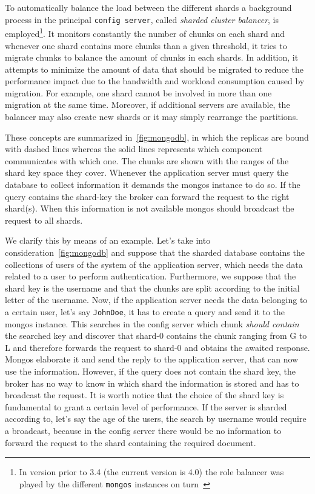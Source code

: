 To automatically balance the load between the different shards a background
process in the principal \texttt{config server}, called \emph{sharded cluster
balancer},
is employed\footnote{In version prior to 3.4 (the current version is 4.0) the
role balancer was played by the different \texttt{mongos}
instances on turn~\cite{bib:mongodb-docs}}. It monitors constantly the number
of chunks on each shard and  whenever one  shard contains more chunks than a
given threshold, it tries to migrate chunks to balance the amount of chunks
in each shards. In addition, it attempts to minimize the amount of data
that should be migrated to reduce the performance impact due to the bandwidth
and workload consumption caused by migration. For example, one shard cannot be
involved in more than one migration at the same time. Moreover, if additional
servers are available, the balancer may also create new shards or it may simply
rearrange the partitions.

These concepts are summarized in~\autoref{fig:mongodb}, in which the replicas
are bound with dashed lines whereas the solid lines represents which
component communicates with which one. The chunks are shown with the
ranges of the shard key space they cover.
Whenever the application server must query the database to collect information
it demands the mongos instance to do so. If the query contains the shard-key
the broker can forward the request to the right shard(s). When this information
is not available mongos should broadcast the request to all shards.

We clarify this by means of an example. Let's take into
consideration~\autoref{fig:mongodb} and suppose that the sharded database
contains the collections of users of the system of the application server,
which needs the data related to a user to perform authentication.
Furthermore, we suppose that the shard key is the username and that the chunks
are split according to the initial letter of the username. Now, if the
application server needs the data belonging to a certain user, let's say
\texttt{JohnDoe}, it has to create a query and send it to the mongos instance.
This searches in the config server which chunk \emph{should contain} the
searched key and discover that shard-0 contains the chunk ranging from G to L
and therefore forwards the request to shard-0 and obtains the awaited response.
Mongos elaborate it and send the reply to the application server, that can now
use the information. However, if the query does not contain the shard key, the
broker has no way to know in which shard the information is stored and has to
broadcast the request.
It is worth notice that the choice of the shard key is fundamental to grant a
certain level of performance. If the server is sharded according to, let's say
the age of the users, the search by username would require a broadcast, because
in the config server there would be no information to forward the request to
the shard containing the required document.



